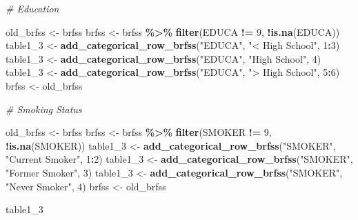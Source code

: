 \documentclass[
]{article}
\newenvironment{Shaded}{\begin{snugshade}}{\end{snugshade}}
\newcommand{\CommentTok}[1]{\textcolor[rgb]{0.56,0.35,0.01}{\textit{#1}}}
\newcommand{\DecValTok}[1]{\textcolor[rgb]{0.00,0.00,0.81}{#1}}
\newcommand{\FunctionTok}[1]{\textcolor[rgb]{0.13,0.29,0.53}{\textbf{#1}}}
\newcommand{\NormalTok}[1]{#1}
\newcommand{\OtherTok}[1]{\textcolor[rgb]{0.56,0.35,0.01}{#1}}
\newcommand{\SpecialCharTok}[1]{\textcolor[rgb]{0.81,0.36,0.00}{\textbf{#1}}}
\newcommand{\StringTok}[1]{\textcolor[rgb]{0.31,0.60,0.02}{#1}}
\begin{document}
\begin{Shaded}
\begin{Highlighting}[]
\CommentTok{\# Education}

\NormalTok{old\_brfss }\OtherTok{\textless{}{-}}\NormalTok{ brfss}
\NormalTok{brfss }\OtherTok{\textless{}{-}}\NormalTok{ brfss }\SpecialCharTok{\%\textgreater{}\%} 
  \FunctionTok{filter}\NormalTok{(EDUCA }\SpecialCharTok{!=} \DecValTok{9}\NormalTok{, }\SpecialCharTok{!}\FunctionTok{is.na}\NormalTok{(EDUCA))}
\NormalTok{table1\_3 }\OtherTok{\textless{}{-}} \FunctionTok{add\_categorical\_row\_brfss}\NormalTok{(}\StringTok{"EDUCA"}\NormalTok{, }\StringTok{"\textless{} High School"}\NormalTok{, }\DecValTok{1}\SpecialCharTok{:}\DecValTok{3}\NormalTok{)}
\NormalTok{table1\_3 }\OtherTok{\textless{}{-}} \FunctionTok{add\_categorical\_row\_brfss}\NormalTok{(}\StringTok{"EDUCA"}\NormalTok{, }\StringTok{"High School"}\NormalTok{, }\DecValTok{4}\NormalTok{)}
\NormalTok{table1\_3 }\OtherTok{\textless{}{-}} \FunctionTok{add\_categorical\_row\_brfss}\NormalTok{(}\StringTok{"EDUCA"}\NormalTok{, }\StringTok{"\textgreater{} High School"}\NormalTok{, }\DecValTok{5}\SpecialCharTok{:}\DecValTok{6}\NormalTok{)}
\NormalTok{brfss }\OtherTok{\textless{}{-}}\NormalTok{ old\_brfss}

\CommentTok{\# Smoking Status}

\NormalTok{old\_brfss }\OtherTok{\textless{}{-}}\NormalTok{ brfss}
\NormalTok{brfss }\OtherTok{\textless{}{-}}\NormalTok{ brfss }\SpecialCharTok{\%\textgreater{}\%} 
  \FunctionTok{filter}\NormalTok{(SMOKER }\SpecialCharTok{!=} \DecValTok{9}\NormalTok{, }\SpecialCharTok{!}\FunctionTok{is.na}\NormalTok{(SMOKER))}
\NormalTok{table1\_3 }\OtherTok{\textless{}{-}} \FunctionTok{add\_categorical\_row\_brfss}\NormalTok{(}\StringTok{"SMOKER"}\NormalTok{, }\StringTok{"Current Smoker"}\NormalTok{, }\DecValTok{1}\SpecialCharTok{:}\DecValTok{2}\NormalTok{)}
\NormalTok{table1\_3 }\OtherTok{\textless{}{-}} \FunctionTok{add\_categorical\_row\_brfss}\NormalTok{(}\StringTok{"SMOKER"}\NormalTok{, }\StringTok{"Former Smoker"}\NormalTok{, }\DecValTok{3}\NormalTok{)}
\NormalTok{table1\_3 }\OtherTok{\textless{}{-}} \FunctionTok{add\_categorical\_row\_brfss}\NormalTok{(}\StringTok{"SMOKER"}\NormalTok{, }\StringTok{"Never Smoker"}\NormalTok{, }\DecValTok{4}\NormalTok{)}
\NormalTok{brfss }\OtherTok{\textless{}{-}}\NormalTok{ old\_brfss}

\NormalTok{table1\_3}
\end{Highlighting}
\end{Shaded}
\end{document}
